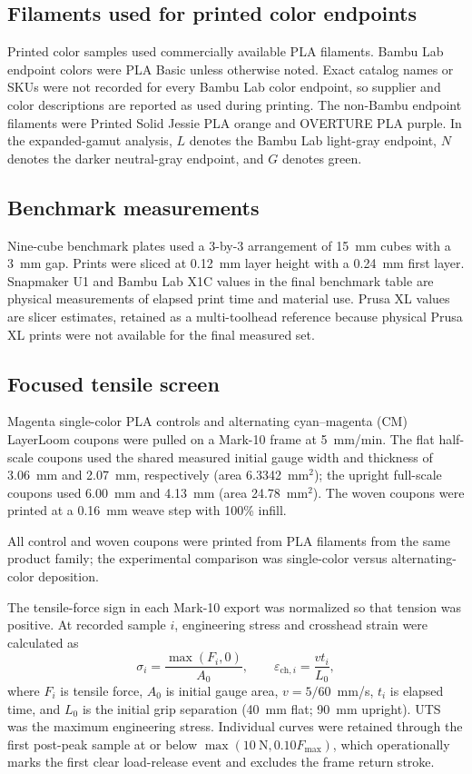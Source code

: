\documentclass[preprint,12pt,authoryear]{elsarticle}
\begin{document}
\subsection*{Filaments used for printed color endpoints}

Printed color samples used commercially available PLA filaments. Bambu Lab endpoint colors were PLA Basic unless otherwise noted. Exact catalog names or SKUs were not recorded for every Bambu Lab color endpoint, so supplier and color descriptions are reported as used during printing. The non-Bambu endpoint filaments were Printed Solid Jessie PLA orange and OVERTURE PLA purple. In the expanded-gamut analysis, \(L\) denotes the Bambu Lab light-gray endpoint, \(N\) denotes the darker neutral-gray endpoint, and \(G\) denotes green.

\subsection*{Benchmark measurements}

Nine-cube benchmark plates used a 3-by-3 arrangement of 15~mm cubes with a 3~mm gap. Prints were sliced at 0.12~mm layer height with a 0.24~mm first layer. Snapmaker U1 and Bambu Lab X1C values in the final benchmark table are physical measurements of elapsed print time and material use. Prusa XL values are slicer estimates, retained as a multi-toolhead reference because physical Prusa XL prints were not available for the final measured set.

\subsection*{Focused tensile screen}

Magenta single-color PLA controls and alternating cyan--magenta (CM) LayerLoom coupons were pulled on a Mark-10 frame at 5~mm/min. The flat half-scale coupons used the shared measured initial gauge width and thickness of 3.06~mm and 2.07~mm, respectively (area 6.3342~mm\(^2\)); the upright full-scale coupons used 6.00~mm and 4.13~mm (area 24.78~mm\(^2\)). The woven coupons were printed at a 0.16~mm weave step with 100\% infill.

All control and woven coupons were printed from PLA filaments from the same product family; the experimental comparison was single-color versus alternating-color deposition.

The tensile-force sign in each Mark-10 export was normalized so that tension was positive. At recorded sample \(i\), engineering stress and crosshead strain were calculated as
\[
\sigma_i = \frac{\max(F_i,0)}{A_0},
\qquad
\varepsilon_{\mathrm{ch},i} = \frac{v t_i}{L_0},
\]
where \(F_i\) is tensile force, \(A_0\) is initial gauge area, \(v=5/60\)~mm/s, \(t_i\) is elapsed time, and \(L_0\) is the initial grip separation (40~mm flat; 90~mm upright). UTS was the maximum engineering stress. Individual curves were retained through the first post-peak sample at or below \(\max(10~\mathrm{N},0.10F_{\max})\), which operationally marks the first clear load-release event and excludes the frame return stroke.
\end{document}
